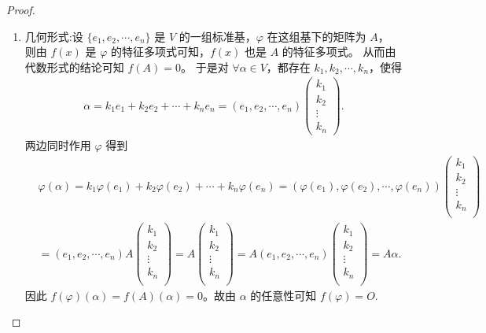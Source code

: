 \documentclass[../../main.tex]{subfiles}
\begin{document}
\begin{proof}
\begin{enumerate}
\item {\heiti 几何形式:}设 $\{ e_1,e_2,\cdots ,e_n \}$ 是 $V$ 的一组标准基，$\varphi$ 在这组基下的矩阵为 $A$，  
则由 $f(x)$ 是 $\varphi$ 的特征多项式可知，$f(x)$ 也是 $A$ 的特征多项式。  
从而由代数形式的结论可知 $f(A) = 0$。  
于是对 $\forall \alpha \in V$，都存在 $k_1,k_2,\cdots ,k_n$，使得  
\begin{align*}
\alpha = k_1e_1+k_2e_2+\cdots +k_ne_n 
= \left( e_1,e_2,\cdots ,e_n \right) \begin{pmatrix}
k_1\\
k_2\\
\vdots\\
k_n
\end{pmatrix}.
\end{align*}
两边同时作用 $\varphi$ 得到  
\begin{align*}
&\varphi \left( \alpha \right) =k_1\varphi \left( e_1 \right) +k_2\varphi \left( e_2 \right) +\cdots +k_n\varphi \left( e_n \right) =\left( \varphi \left( e_1 \right) ,\varphi \left( e_2 \right) ,\cdots ,\varphi \left( e_n \right) \right) \left( \begin{array}{c}
k_1\\
k_2\\
\vdots\\
k_n\\
\end{array} \right) 
\\
&=\left( e_1,e_2,\cdots ,e_n \right) A\left( \begin{array}{c}
k_1\\
k_2\\
\vdots\\
k_n\\
\end{array} \right) =A\left( \begin{array}{c}
k_1\\
k_2\\
\vdots\\
k_n\\
\end{array} \right) =A\left( e_1,e_2,\cdots ,e_n \right) \left( \begin{array}{c}
k_1\\
k_2\\
\vdots\\
k_n\\
\end{array} \right) =A\alpha .
\end{align*}
因此 $f(\varphi)(\alpha) = f(A)(\alpha) = 0$。故由 $\alpha$ 的任意性可知 $f(\varphi) = O$.
\end{enumerate}
\end{proof}
\end{document}
